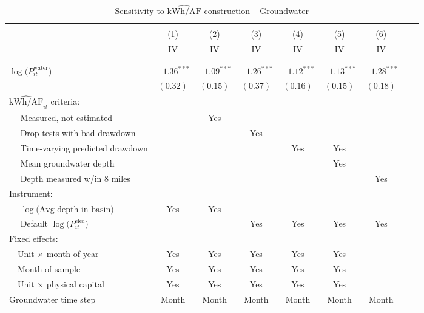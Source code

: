\begin{table}[t!]\centering
\small
\caption{Sensitivity to $\widehat{\text{kWh}/\text{AF}}$ construction -- Groundwater  \label{tab:water_kwhaf_sensitivities}}
\vspace{-0.1cm}
\small
\begin{adjustbox}{center} 
\begin{tabular}{lcccccccc} 
\hline \hline
\vspace{-0.37cm}
\\
 & (1)  & (2)  & (3)  & (4)  & (5) & (6) \\ 
[0.1em]
 & IV & IV & IV & IV & IV & IV \\
\vspace{-0.37cm}
\\
\cline{2-7}
\vspace{-0.27cm}
\\
 $\log\big(P^{\text{water}}_{it}\big)$ ~ & 
 $-1.36$$^{***}$  & $-1.09$$^{***}$ & $-1.26$$^{***}$ & $-1.12$$^{***}$ & $-1.13$$^{***}$ & $-1.28$$^{***}$ \\ 
& $(0.32)$ & $(0.15)$ & $(0.37)$ & $(0.16)$ & $(0.15)$ & $(0.18)$  \\
[1.5em] 
$\widehat{{{\text{kWh}}}/{\text{AF}}}_{it}$ criteria: \\
[0.1em] 
~~ Measured, not estimated  & & Yes & & & & \\
[0.1em] 
~~ Drop tests with bad drawdown  & &  & Yes & & \\
[0.1em] 
~~ Time-varying predicted drawdown  & &  &  & Yes & Yes & \\
[0.1em] 
~~ Mean groundwater depth  & &  &  &  & Yes & \\
[0.1em] 
~~ Depth measured w/in 8 miles  & &  &  &  &  & Yes \\
[1em] 
Instrument: \\
[0.1em] 
~~ $\log\big(\text{Avg depth in basin}\big)$  & Yes & Yes &  &  & & \\
[0.1em] 
~~ Default $\log\big(P^{\text{elec}}_{it}\big)$  & & & Yes  & Yes  & Yes & Yes \\
[1em] 
Fixed effects: \\
[0.1em] 
~~Unit $\times$ month-of-year  & Yes  & Yes  & Yes   & Yes  & Yes   \\ 
[0.1em] 
~~Month-of-sample  & Yes  & Yes  & Yes  & Yes  & Yes    \\ 
[0.1em] 
~~Unit $\times$ physical capital & Yes & Yes & Yes & Yes & Yes  \\
[1em] 
Groundwater time step & Month & Month & Month & Month & Month & Month \\ 

\end{tabular}
\end{adjustbox}
\end{table}
